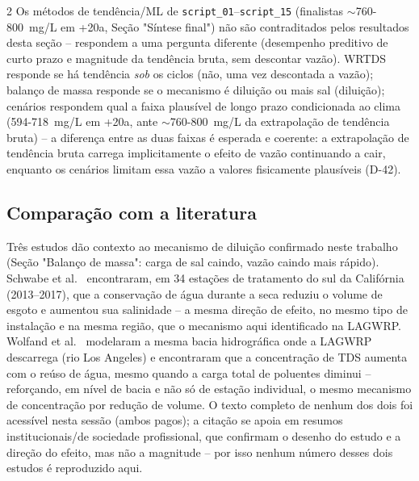 \begin{multicols*}{2}
Os métodos de tendência/ML de \texttt{script\_01}--\texttt{script\_15} (finalistas $\sim$760-800~mg/L em +20a, Seção "Síntese final") não são contraditados pelos resultados desta seção -- respondem a uma pergunta diferente (desempenho preditivo de curto prazo e magnitude da tendência bruta, sem descontar vazão). WRTDS responde se há tendência \textit{sob} os ciclos (não, uma vez descontada a vazão); balanço de massa responde se o mecanismo é diluição ou mais sal (diluição); cenários respondem qual a faixa plausível de longo prazo condicionada ao clima (594-718~mg/L em +20a, ante $\sim$760-800~mg/L da extrapolação de tendência bruta) -- a diferença entre as duas faixas é esperada e coerente: a extrapolação de tendência bruta carrega implicitamente o efeito de vazão continuando a cair, enquanto os cenários limitam essa vazão a valores fisicamente plausíveis (D-42).

\subsection{Comparação com a literatura}

Três estudos dão contexto ao mecanismo de diluição confirmado neste trabalho (Seção "Balanço de massa": carga de sal caindo, vazão caindo mais rápido). Schwabe et al.\ \cite{schwabe2020unintended} encontraram, em 34 estações de tratamento do sul da Califórnia (2013--2017), que a conservação de água durante a seca reduziu o volume de esgoto e aumentou sua salinidade -- a mesma direção de efeito, no mesmo tipo de instalação e na mesma região, que o mecanismo aqui identificado na LAGWRP. Wolfand et al.\ \cite{wolfand2022dilution} modelaram a mesma bacia hidrográfica onde a LAGWRP descarrega (rio Los Angeles) e encontraram que a concentração de TDS aumenta com o reúso de água, mesmo quando a carga total de poluentes diminui -- reforçando, em nível de bacia e não só de estação individual, o mesmo mecanismo de concentração por redução de volume. O texto completo de nenhum dos dois foi acessível nesta sessão (ambos pagos); a citação se apoia em resumos institucionais/de sociedade profissional, que confirmam o desenho do estudo e a direção do efeito, mas não a magnitude -- por isso nenhum número desses dois estudos é reproduzido aqui.


\end{multicols*}
